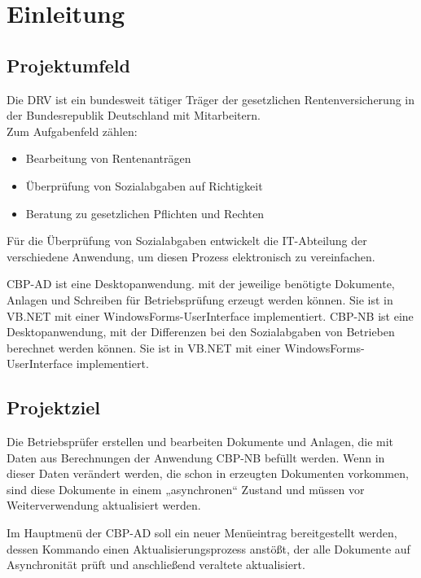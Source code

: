 \section{Einleitung}
\label{sec:Einleitung}


\subsection{Projektumfeld} 
\label{sec:Projektumfeld}

Die \ac{DRV} ist ein bundesweit tätiger Träger der gesetzlichen Rentenversicherung in der Bundesrepublik Deutschland
mit  Mitarbeitern.\\
Zum Aufgabenfeld zählen:
\begin{itemize}
	\item Bearbeitung von Rentenanträgen
	\item Überprüfung von Sozialabgaben auf Richtigkeit
	\item Beratung zu gesetzlichen Pflichten und Rechten
\end{itemize}

Für die Überprüfung von Sozialabgaben entwickelt die IT-Abteilung der \DRV verschiedene Anwendung, um diesen Prozess elektronisch zu vereinfachen.

\ac{CBP-AD} ist eine Desktopanwendung. mit der jeweilige benötigte Dokumente, Anlagen und Schreiben für Betriebsprüfung erzeugt werden können. Sie ist in VB.NET mit einer WindowsForms-UserInterface implementiert.
\ac{CBP-NB} ist eine Desktopanwendung, mit der Differenzen bei den Sozialabgaben von Betrieben berechnet werden können. Sie ist in VB.NET mit einer WindowsForms-UserInterface implementiert.

\subsection{Projektziel} 
\label{sec:Projektziel}

Die Betriebsprüfer erstellen und bearbeiten Dokumente und Anlagen, die mit Daten aus Berechnungen der Anwendung \acs{CBP-NB} befüllt werden. Wenn in dieser Daten verändert werden, die schon in erzeugten Dokumenten vorkommen, sind diese Dokumente in einem „asynchronen“ Zustand und müssen vor Weiterverwendung aktualisiert werden.

Im Hauptmenü der \acs{CBP-AD} soll ein neuer Menüeintrag bereitgestellt werden, dessen Kommando einen Aktualisierungsprozess anstößt, der alle Dokumente auf Asynchronität prüft und anschließend veraltete aktualisiert.

